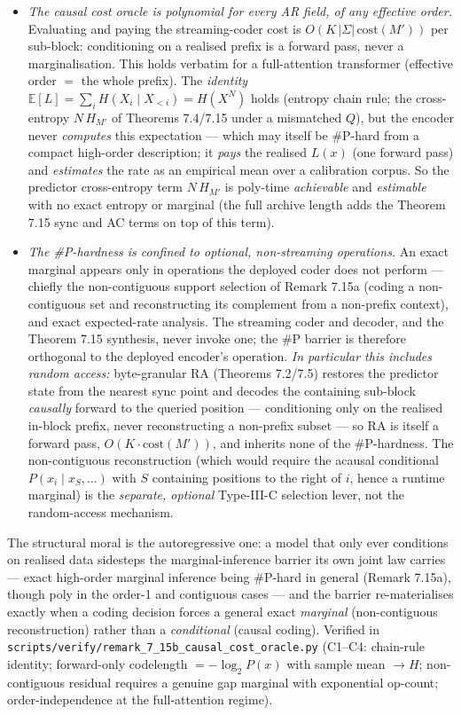 \documentclass[
]{article}
\begin{document}
\begin{itemize}
\item \emph{The causal cost oracle is polynomial for every AR field, of any
effective order.} Evaluating and paying the streaming-coder cost is
$O(K\,|\Sigma|\,\mathrm{cost}(M'))$ per sub-block: conditioning on a realised
prefix is a forward pass, never a marginalisation. This holds verbatim for a
full-attention transformer (effective order $=$ the whole prefix). The
\emph{identity} $\mathbb{E}[L]=\sum_i H(X_i\mid X_{<i})=H(X^N)$ holds (entropy
chain rule; the cross-entropy $N\,H_{M'}$ of Theorems 7.4/7.15 under a
mismatched $Q$), but the encoder never \emph{computes} this expectation ---
which may itself be \#P-hard from a compact high-order description; it
\emph{pays} the realised $L(x)$ (one forward pass) and \emph{estimates} the
rate as an empirical mean over a calibration corpus. So the predictor
cross-entropy term $N\,H_{M'}$ is poly-time \emph{achievable} and
\emph{estimable} with no exact entropy or marginal (the full archive length
adds the Theorem 7.15 sync and AC terms on top of this term).
\item \emph{The \#P-hardness is confined to optional, non-streaming
operations.} An exact marginal appears only in operations the deployed coder
does not perform --- chiefly the non-contiguous support selection of Remark
7.15a (coding a non-contiguous set and reconstructing its complement from a
non-prefix context), and exact expected-rate analysis. The streaming coder and
decoder, and the Theorem 7.15 synthesis, never invoke one; the \#P barrier is
therefore orthogonal to the deployed encoder's operation. \emph{In particular
this includes random access:} byte-granular RA (Theorems 7.2/7.5) restores the
predictor state from the nearest sync point and decodes the containing
sub-block \emph{causally} forward to the queried position --- conditioning only
on the realised in-block prefix, never reconstructing a non-prefix subset ---
so RA is itself a forward pass, $O(K\cdot\mathrm{cost}(M'))$, and inherits none
of the \#P-hardness. The non-contiguous reconstruction (which would require the
acausal conditional $P(x_i\mid x_S,\dots)$ with $S$ containing positions to the
right of $i$, hence a runtime marginal) is the \emph{separate, optional}
Type-III-C selection lever, not the random-access mechanism.
\end{itemize}
The structural moral is the autoregressive one: a model that only ever
conditions on realised data sidesteps the marginal-inference barrier its own
joint law carries --- exact high-order marginal inference being \#P-hard in
general (Remark 7.15a), though poly in the order-1 and contiguous cases --- and
the barrier re-materialises exactly when a coding decision forces a general
exact \emph{marginal} (non-contiguous reconstruction) rather than a
\emph{conditional} (causal coding). Verified in
\texttt{scripts/verify/remark\_7\_15b\_causal\_cost\_oracle.py} (C1--C4:
chain-rule identity; forward-only codelength $=-\log_2 P(x)$ with sample mean
$\to H$; non-contiguous residual requires a genuine gap marginal with
exponential op-count; order-independence at the full-attention regime).
\end{document}
